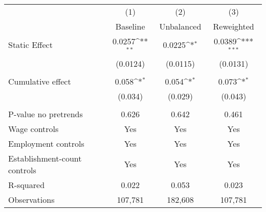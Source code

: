 {
\def\sym#1{\ifmmode^{#1}\else\(^{#1}\)\fi}
\begin{tabular}{l*{3}{c}}
\hline\hline
          &\multicolumn{1}{c}{(1)}&\multicolumn{1}{c}{(2)}&\multicolumn{1}{c}{(3)}\\
          &\multicolumn{1}{c}{Baseline}&\multicolumn{1}{c}{Unbalanced}&\multicolumn{1}{c}{Reweighted}\\
\hline
Static Effect&   0.0257\sym{**} &   0.0225\sym{*}  &   0.0389\sym{***}\\
          & (0.0124)         & (0.0115)         & (0.0131)         \\
\hline
\vspace{-1mm}&                  &                  &                  \\
Cumulative effect&0.058\sym{*}         &0.054\sym{*}         &0.073\sym{*}         \\
          &  (0.034)         &  (0.029)         &  (0.043)         \\
\hline    &                  &                  &                  \\
P-value no pretrends&    0.626         &    0.642         &    0.461         \\
Wage controls&      Yes         &      Yes         &      Yes         \\
Employment controls&      Yes         &      Yes         &      Yes         \\
Establishment-count controls&      Yes         &      Yes         &      Yes         \\
R-squared &    0.022         &    0.053         &    0.023         \\
Observations&  107,781         &  182,608         &  107,781         \\
\hline\hline
\end{tabular}
}
